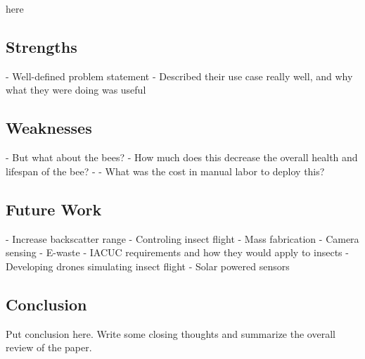 here\documentclass[letterpaper,twocolumn,10pt]{article}
\begin{document}
\subsection*{Strengths}

- Well-defined problem statement
    - Described their use case really well, and why what they were doing was useful

\subsection*{Weaknesses}

- But what about the bees?
    - How much does this decrease the overall health and lifespan of the bee?
- 
- What was the cost in manual labor to deploy this?

\subsection*{Future Work}

- Increase backscatter range
- Controling insect flight
- Mass fabrication
- Camera sensing
- E-waste
- IACUC requirements and how they would apply to insects
- Developing drones simulating insect flight
- Solar powered sensors

\subsection*{Conclusion}

Put conclusion here. Write some closing thoughts and summarize the overall review of the paper.
\end{document}
